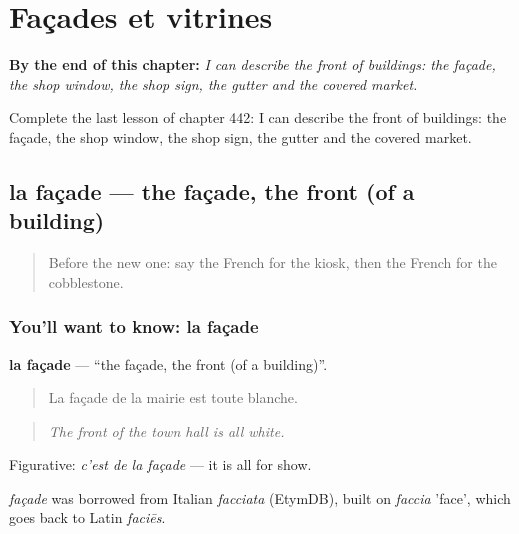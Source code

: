 
\chapter{Façades et vitrines}
\label{ch:fr-facades-et-vitrines}

\begin{chapteropening}
\textbf{By the end of this chapter:} \emph{I can describe the front of buildings: the façade, the shop window, the shop sign, the gutter and the covered market.}

Complete the last lesson of chapter 442: I can describe the front of buildings: the façade, the shop window, the shop sign, the gutter and the covered market.
\end{chapteropening}

\section[la façade]{la façade — the façade, the front (of a building)}

\label{lesson:FR-C442-facade}



\begin{quote}
Before the new one: say the French for the kiosk, then the French for the cobblestone.
\end{quote}

\subsection*{You'll want to know: la façade}
\textbf{la façade} — \textquotedblleft{}the façade, the front (of a building)\textquotedblright{}.

\begin{quote}
La façade de la mairie est toute blanche.
\end{quote}

\begin{quote}
\emph{The front of the town hall is all white.}
\end{quote}

Figurative: \emph{c'est de la façade} — it is all for show.

\begin{cousinweb}
\emph{façade} was borrowed from Italian \emph{facciata} (EtymDB), built on \emph{faccia} 'face', which goes back to Latin \emph{faciēs}.
\end{cousinweb}

